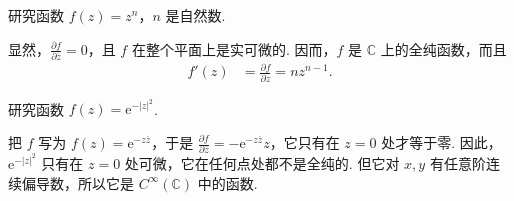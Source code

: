 \documentclass[../../main.tex]{subfiles}%
\begin{document}
\begin{example}
研究函数 $f(z) = z^n$，$n$ 是自然数.
\end{example}
\begin{solution}

显然，$\frac{\partial f}{\partial \overline{z}} = 0$，且 $f$ 在整个平面上是实可微的. 因而，$f$ 是 $\mathbb{C}$ 上的全纯函数，而且
\begin{align}
f'(z) &= \frac{\partial f}{\partial z} = nz^{n - 1}. \label{eq:2.2.5}
\end{align}

\end{solution}

\begin{example}
研究函数 $f(z) = \mathrm{e}^{-\vert z \vert^2}$.
\end{example}
\begin{solution}

把 $f$ 写为 $f(z) = \mathrm{e}^{-z\overline{z}}$，于是 $\frac{\partial f}{\partial \overline{z}} = -\mathrm{e}^{-z\overline{z}}z$，它只有在 $z = 0$ 处才等于零. 因此，$\mathrm{e}^{-\vert z \vert^2}$ 只有在 $z = 0$ 处可微，它在任何点处都不是全纯的. 但它对 $x, y$ 有任意阶连续偏导数，所以它是 $C^\infty(\mathbb{C})$ 中的函数.

\end{solution}
\end{document}
